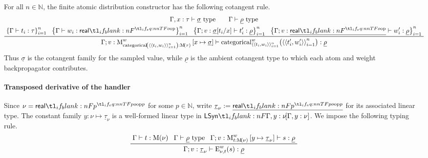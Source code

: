\documentclass[11pt,a4paper]{article}
\theoremstyle{definition}
\theoremstyle{remark}
\providecommand{\N}{\mathbb{N}}
\providecommand{\casubst}[3]{#1[#3/#2]}
\providecommand{\lintype}[1]{\underline{#1}}
\begin{document}
For all \( n \in \N \), the finite atomic distribution constructor has the
following cotangent rule.
\begin{equation*}
  \begin{gathered}
    \Gamma, x : \tau \vdash \lintype{\sigma} \text{ type}
    \qquad
    \Gamma \vdash \lintype{\rho} \text{ type}
    \\
    \prftree{
      \left\{
        \Gamma \vdash t_{i} : \tau
      \right\}_{i = 1}^{n}
    }{
      \left\{
        \Gamma \vdash w_{i} : \srcreal
      \right\}_{i = 1}^{n}
    }{
      \left\{
        \Gamma; v : \casubst{\lintype{\sigma}}{x}{t_{i}}
        \vdash
        t_{i}' : \lintype{\rho}
      \right\}_{i = 1}^{n}
    }{
      \left\{
        \Gamma; v : \lintype{\srcreal} \vdash
        w_{i}' : \lintype{\rho}
      \right\}_{i = 1}^{n}
    }{
      \Gamma;
      v : \opn[b]{M}^{w}_{
        \fn[n]{ \opn[b]{categorical} }{
          \tuple{ \tuple{ t_{i}, w_{i} } }_{i = 1}^{n}
        } :
        \Fun[nn]{ \opn[b]{M} }{ \tau }
      }
      \left[ x \mapsto \lintype{\sigma} \right]
      \vdash
      \fn[n]{
        \opn[b]{categorical}^{w}_{
          \tuple{ \tuple{ t_{i}, w_{i} } }_{i = 1}^{n}
        }
      }{
        \tuple{ \tuple{ t_{i}', w_{i}' } }_{i = 1}^{n}
      } :
      \lintype{\rho}
    }
  \end{gathered}
\end{equation*}
Thus \(\lintype{\sigma}\) is the cotangent family for the sampled value, while
\(\lintype{\rho}\) is the ambient cotangent type to which each atom and weight
backpropagator contributes.

\paragraph{Transposed derivative of the handler}

Since \( \nu = \srcreal[p] \) for some \( p \in \N \), write
\( \lintype{\tau}_{\nu} := \lintype{\srcreal[p]} \) for its associated
linear type.  The constant family
\(y:\nu\mapsto\lintype{\tau}_{\nu}\) is a well-formed linear type in
\(\LSyn[\Gamma,y:\nu]\).  We impose the following typing rule.
\begin{equation*}
  \prftree{
    \Gamma \vdash t : \Fun[nn]{ \opn[b]{M} }{ \nu }
  }{
    \Gamma \vdash \lintype{\rho} \text{ type}
  }{
    \Gamma; v : \opn[b]{M}^{w}_{t : \Fun[nn]{ \opn[b]{M} }{ \nu }}
    \left[ y \mapsto \lintype{\tau}_{\nu} \right]
    \vdash s : \lintype{\rho}
  }{
    \Gamma; v : \lintype{\tau}_{\nu}
    \vdash \fn[n]{ \opn[b]{E}^{w}_{\nu, t} }{ s } : \lintype{\rho}
  }
\end{equation*}
\end{document}

